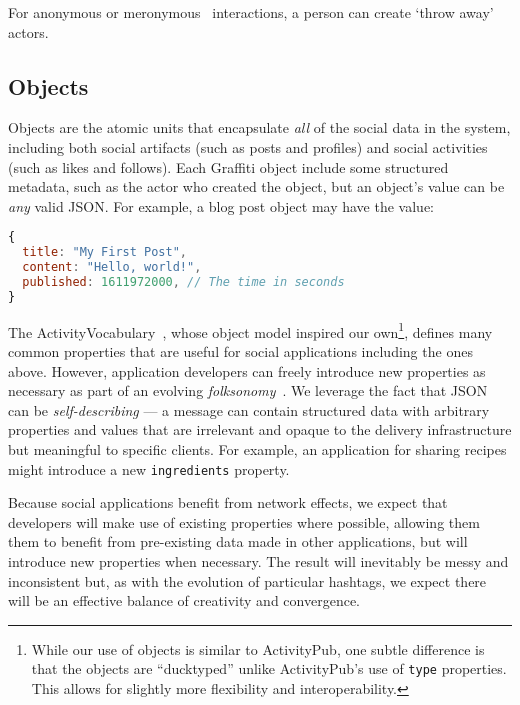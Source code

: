 For anonymous or meronymous~\cite{meronymous} interactions,
a person can create `throw away' actors.

\subsection{Objects}
\label{concepts:objects}

Objects are the atomic units that encapsulate \emph{all}
of the social data in the system, including
both social artifacts (such as posts and profiles) and social activities (such as likes and follows).
Each Graffiti object include some structured metadata,
such as the actor who created the object,
but an object's value can be \emph{any} valid JSON.
For example, a blog post object may have the value:

\begin{lstlisting}[language=javascript]
{
  title: "My First Post",
  content: "Hello, world!",
  published: 1611972000, // The time in seconds
}
\end{lstlisting}

The ActivityVocabulary~\cite{activity-vocabulary},
whose object model inspired our own\footnote{
    While our use of objects is similar to ActivityPub, one subtle difference is
    that the objects are ``ducktyped'' unlike ActivityPub's use of \texttt{type} properties.
    This allows for slightly more flexibility and interoperability.
},
defines many common properties that are useful for social applications including
the ones above.
However, application developers can freely introduce new properties as necessary
as part of an evolving \emph{folksonomy}~\cite{folksonomy}.
We leverage the fact that JSON can be \emph{self-describing}
--- a message can contain structured data with arbitrary properties and
values that are irrelevant and opaque to the delivery infrastructure but
meaningful to specific clients.
For example, an application for sharing recipes might introduce a new
\texttt{ingredients} property.

Because social applications
benefit from network effects, we expect that developers will make use of
existing properties where possible, allowing them them to benefit from pre-existing data
made in other applications, but will introduce new properties when necessary.
The result will inevitably be messy and inconsistent but, as with the evolution of
particular hashtags, we expect there will be an effective balance of creativity and convergence.

